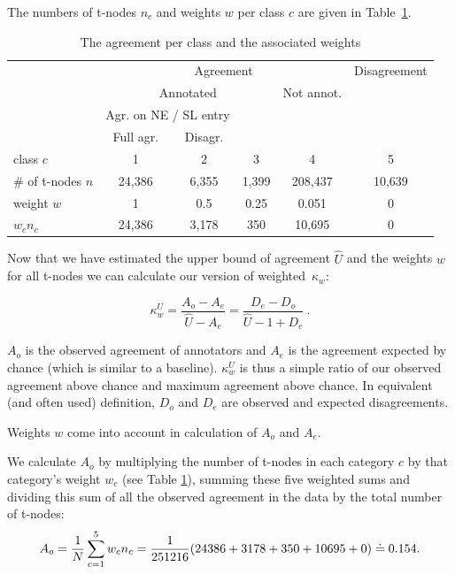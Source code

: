 The numbers of t-nodes $n_c$ and weights $w$ per class $c$ are given in Table~\ref{tab-agreement}.

\begin{table}[H]
\begin{center}
 \begin{tabular}{l|c|c|c|c|c}

&\multicolumn{4}{c|}{Agreement} & Disagreement\\
\cline{2-6}
&\multicolumn{3}{c|}{Annotated} & Not annot. &  \\
\cline{2-5}
&\multicolumn{2}{c|}{Agr. on NE / SL entry} &&&\\
\cline{2-3}
&Full agr. & Disagr. &&&\\
\cline{1-6}
class $c$& 1 & 2 & 3 & 4 & 5\\
\cline{1-6}
\# of t-nodes $n$& 24,386 & 6,355 & 1,399 & 208,437 & 10,639\\
\cline{1-6}
weight $w$ & 1 & 0.5 & 0.25 & 0.051 & 0 \\
\cline{1-6}
$w_c n_c$ & 24,386 & 3,178 & 350 & 10,695 & 0\\
\end{tabular}
\end{center}
\caption{The agreement per class and the associated weights}
\label{tab-agreement}
\end{table}


Now that we have estimated the upper bound of agreement $\widehat{U}$ and the weights $w$ for all t-nodes we can calculate our version of weighted~$\kappa_w$:

\begin{equation}
\label{ourkappa}
\kappa_w^U = \frac{A_o - A_e}{\widehat{U} - A_e} =
             \frac{D_e - D_o}{\widehat{U} - 1 + D_e}\ .
\end{equation}

$A_o$ is the observed agreement of annotators and $A_e$ is the agreement expected by chance (which is similar to a baseline). $\kappa_w^U$ is thus a simple ratio of our observed agreement above chance and maximum agreement above chance. In equivalent (and often used) definition, $D_o$ and $D_e$ are observed and expected disagreements.

Weights $w$ come into account in calculation of $A_o$ and $A_e$.

We calculate $A_o$ by multiplying the number of t-nodes in each category $c$ by that category's weight $w_c$ (see Table \ref{tab-agreement}), summing these five weighted sums and dividing this sum of all the observed agreement in the data by the total number of t-nodes:
\[	A_o = \frac{1}{N} \sum_{c =1}^{5} w_c n_c = \\
	 \frac{1}{251216} (24386 + 3178 + 350 + 10695 + 0) \doteq 0.154.
	\]

